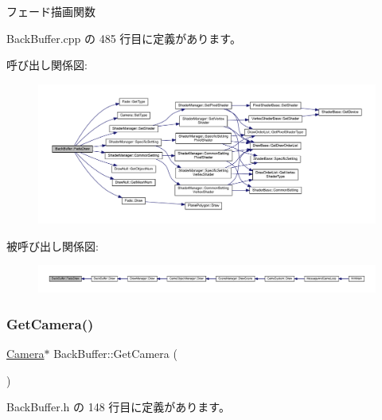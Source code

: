 フェード描画関数 



 Back\+Buffer.\+cpp の 485 行目に定義があります。

呼び出し関係図\+:\nopagebreak
\begin{figure}[H]
\begin{center}
\leavevmode
\includegraphics[width=350pt]{class_back_buffer_a9835a5db9850f774a382c4f8e611b1d1_cgraph}
\end{center}
\end{figure}
被呼び出し関係図\+:
\nopagebreak
\begin{figure}[H]
\begin{center}
\leavevmode
\includegraphics[width=350pt]{class_back_buffer_a9835a5db9850f774a382c4f8e611b1d1_icgraph}
\end{center}
\end{figure}
\mbox{\label{class_back_buffer_addd0da33667c19cfba7f1d81009486f2}} 
\subsubsection{\texorpdfstring{Get\+Camera()}{GetCamera()}}
{\footnotesize\ttfamily \mbox{\hyperlink{class_camera}{Camera}}$\ast$ Back\+Buffer\+::\+Get\+Camera (\begin{DoxyParamCaption}{ }\end{DoxyParamCaption})\hspace{0.3cm}{\ttfamily [inline]}}



 Back\+Buffer.\+h の 148 行目に定義があります。

